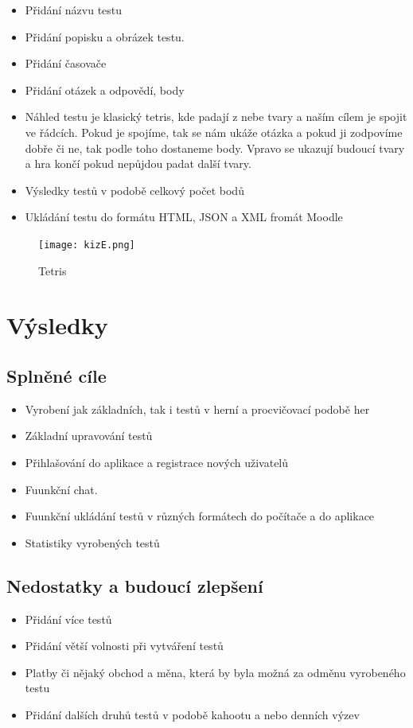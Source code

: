 \documentclass[12pt, a4paper, twoside, openright]{report}
\begin{document}
\begin{itemize}
		\item Přidání názvu testu
		\item Přidání popisku a obrázek testu.
		\item Přidání časovače
            \item Přidání otázek a odpovědí, body
            \item Náhled testu je klasický tetris, kde padají z nebe tvary a naším cílem je spojit ve řádcích. Pokud je spojíme, tak se nám ukáže otázka a pokud ji zodpovíme dobře či ne, tak podle toho dostaneme body. Vpravo se ukazují budoucí tvary a hra končí pokud nepůjdou padat další tvary.
            \item Výsledky testů v podobě celkový počet bodů
            \item Ukládání testu do formátu HTML, JSON a XML fromát Moodle
	\end{itemize}

    \begin{figure}[h]
		\centering
		\texttt{[image: kizE.png]}
		\caption{Tetris}
		\label{fig:architecture}
	\end{figure}
    
    \chapter{Výsledky}

\section{Splněné cíle}
	\begin{itemize}
		\item Vyrobení jak základních, tak i testů v herní a procvičovací podobě her
		\item Základní upravování testů
		\item Přihlašování do aplikace a registrace nových uživatelů
		\item Fuunkční chat.
            \item Fuunkční ukládání testů v různých formátech do počítače a do aplikace
            \item Statistiky vyrobených testů
	\end{itemize}


\section{Nedostatky a budoucí zlepšení}
	\begin{itemize}
		\item Přidání více testů
		\item Přidání větší volnosti při vytváření testů
		\item Platby či nějaký obchod a měna, která by byla možná za odměnu vyrobeného testu
		\item Přidání dalších druhů testů v podobě kahootu a nebo denních výzev
	\end{itemize}
\end{document}
